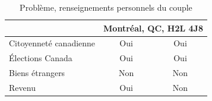 \begin{table}
\begin{tabular}{|l|c|c|}
		                                           &     \multicolumn{2}{c|}{Montréal, QC, H2L 4J8}     \\ \hline
		Citoyenneté canadienne                     &           Oui           &           Oui            \\ \hline
		Élections Canada                           &           Oui           &           Oui            \\ \hline
		Biens étrangers                            &           Non           &           Non            \\ \hline
		Revenu                                     &           Oui           &           Non            \\ \hline
	\end{tabular}
	\caption{Problème, renseignements personnels du couple}
	\label{table:chapitre3ProblemeRenseignementsPersonnelsCouple}
\end{table}



